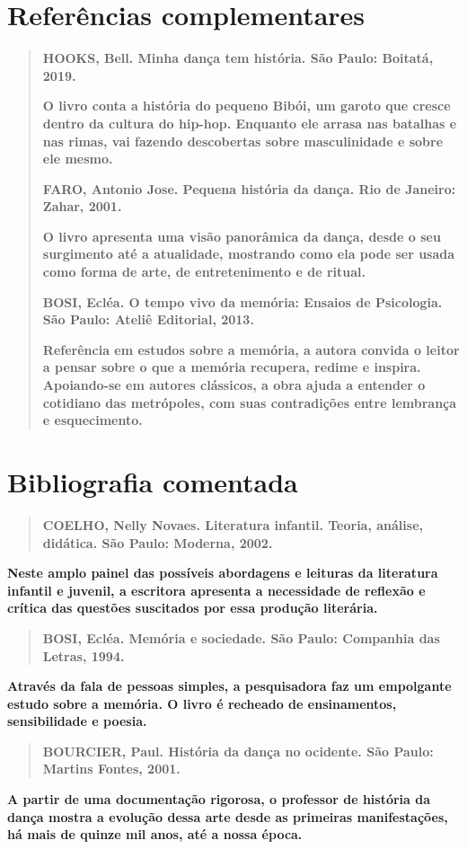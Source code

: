 \documentclass{extarticle}
\begin{document}
\section{Referências complementares}

\begin{quote}
\textbf{HOOKS, Bell. Minha dança tem história. São Paulo: Boitatá,
2019.}

\textbf{O livro conta a história do pequeno Bibói, um garoto que cresce
dentro da cultura do hip-hop. Enquanto ele arrasa nas batalhas e nas
rimas, vai fazendo descobertas sobre masculinidade e sobre ele mesmo.}

\textbf{FARO, Antonio Jose. Pequena história da dança. Rio de Janeiro:
Zahar, 2001.}

\textbf{O livro apresenta uma visão panorâmica da dança, desde o seu
surgimento até a atualidade, mostrando como ela pode ser usada como
forma de arte, de entretenimento e de ritual.}

\textbf{BOSI, Ecléa. O tempo vivo da memória: Ensaios de Psicologia. São
Paulo: Ateliê Editorial, 2013.}

\textbf{Referência em estudos sobre a memória, a autora convida o leitor
a pensar sobre o que a memória recupera, redime e inspira. Apoiando-se
em autores clássicos, a obra ajuda a entender o cotidiano das
metrópoles, com suas contradições entre lembrança e esquecimento.}
\end{quote}


\section{Bibliografia comentada}

\begin{quote}
\textbf{COELHO, Nelly Novaes. Literatura infantil. Teoria, análise,
didática. São Paulo: Moderna, 2002.}
\end{quote}

\textbf{Neste amplo painel das possíveis abordagens e leituras da
literatura infantil e juvenil, a escritora apresenta a necessidade de
reflexão e crítica das questões suscitados por essa produção literária.}

\begin{quote}
\textbf{BOSI, Ecléa. Memória e sociedade. São Paulo: Companhia das
Letras, 1994.}
\end{quote}

\textbf{Através da fala de pessoas simples, a pesquisadora faz um
empolgante estudo sobre a memória. O livro é recheado de ensinamentos,
sensibilidade e poesia.}

\begin{quote}
\textbf{BOURCIER, Paul. História da dança no ocidente. São Paulo:
Martins Fontes, 2001.}
\end{quote}

\textbf{A partir de uma documentação rigorosa, o professor de história
da dança mostra a evolução dessa arte desde as primeiras manifestações,
há mais de quinze mil anos, até a nossa época.}
\end{document}
